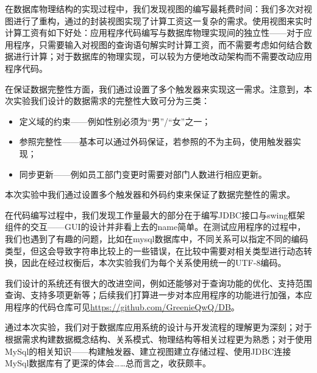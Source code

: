 \documentclass[withoutpreface,bwprint]{cumcmthesis} %
\begin{document}
在数据库物理结构的实现过程中，我们发现视图的编写最耗费时间：我们多次对视图进行了重构，通过的封装视图实现了计算工资这一复杂的需求。使用视图来实时计算工资有如下好处：应用程序代码编写与数据库物理实现间的独立性——对于应用程序，只需要输入对视图的查询语句解实时计算工资，而不需要考虑如何结合数据进行计算；对于数据库的物理实现，可以较为方便地改动架构而不需要改动应用程序代码。

在保证数据完整性方面，我们通过设置了多个触发器来实现这一需求。注意到，本次实验我们设计的数据需求的完整性大致可分为三类：
\begin{itemize}
\item 定义域的约束——例如性别必须为“男”/“女”之一；
\item 参照完整性——基本可以通过外码保证，若参照的不为主码，使用触发器实现；
\item 同步更新——例如员工部门变更时需要对部门人数进行相应更新。
\end{itemize}
本次实验中我们通过设置多个触发器和外码约束来保证了数据完整性的需求。


在代码编写过程中，我们发现工作量最大的部分在于编写JDBC接口与swing框架组件的交互——GUI的设计并非看上去的name简单。在测试应用程序的过程中，我们也遇到了有趣的问题，比如在mysql数据库中，不同关系可以指定不同的编码类型，但这会导致字符串比较上的一些错误，在比较中需要对相关类型进行动态转换，因此在经过权衡后，本次实验我们为每个关系使用统一的UTF-8编码。
 
我们设计的系统还有很大的改进空间，例如还能够对于查询功能的优化、支持范围查询、支持多项更新等；后续我们打算进一步对本应用程序的功能进行加强，本应用程序的代码仓库可见\url{https://github.com/GreenieQwQ/DB}。


通过本次实验，我们对于数据库应用系统的设计与开发流程的理解更为深刻；对于根据需求构建数据概念结构、关系模式、物理结构等相关过程更为熟悉；对于使用MySql的相关知识——构建触发器、建立视图建立存储过程、使用JDBC连接MySql数据库有了更深的体会……总而言之，收获颇丰。



\end{document}
